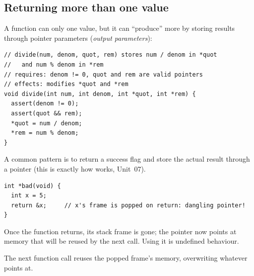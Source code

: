 \subsection{Returning more than one value}

A function can only  one value, but it can ``produce'' more by storing results
through pointer parameters (\emph{output parameters}):
\begin{lstlisting}[style=c]
// divide(num, denom, quot, rem) stores num / denom in *quot
//   and num % denom in *rem
// requires: denom != 0, quot and rem are valid pointers
// effects: modifies *quot and *rem
void divide(int num, int denom, int *quot, int *rem) {
  assert(denom != 0);
  assert(quot && rem);
  *quot = num / denom;
  *rem = num % denom;
}
\end{lstlisting}
A common pattern is to return a  success flag and store the actual result through a
pointer (this is exactly how  works, Unit~07).

\begin{important}
\begin{lstlisting}[style=c]
int *bad(void) {
  int x = 5;
  return &x;     // x's frame is popped on return: dangling pointer!
}
\end{lstlisting}
Once the function returns, its stack frame is gone; the pointer now points at memory that will
be reused by the next call. Using it is undefined behaviour.
\end{important}

\begin{center}
\end{center}
The next function call reuses the popped frame's memory, overwriting whatever  points at.

